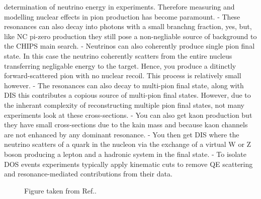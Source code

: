 determination of neutrino energy in experiments. Therefore measuring and modelling nuclear effects
in pion production has become paramount.
- These resonances can also decay into photons with a small branchng fraction, yes, but, like NC
pi-zero production they still pose a non-negliable source of background to the CHIPS main search.
- Neutrinos can also coherently produce single pion final state. In this case the neutrino
coherently scatters from the entire nucleus transferring negligable energy to the target. Hence,
you produce a ditinctly forward-scattered pion with no nuclear recoil. This process is relatively
small however.
- The resonances can also decay to multi-pion final state, along with DIS this contributes a
copious source of multi-pion final states. However, due to the inherant complexity of
reconstructing multiple pion final states, not many experiments look at these cross-sections.
- You can also get kaon production but they have small cross-sections due to the kain mass and
because kaon channels are not enhanced by any dominant resonance.
- You then get DIS where the neutrino scatters of a quark in the nucleon via the exchange of a
virtual W or Z boson producing a lepton and a hadronic system in the final state.
- To isolate DOS events experiments typically apply kinematic cuts to remove QE scattering and
resonance-mediated contributions from their data.

\begin{figure} %
    \centering
    \quad
    \caption[The caption]
    {Figure taken from Ref.\cite{formaggio2012}.}
    \label{fig:cross_sections}
\end{figure}

